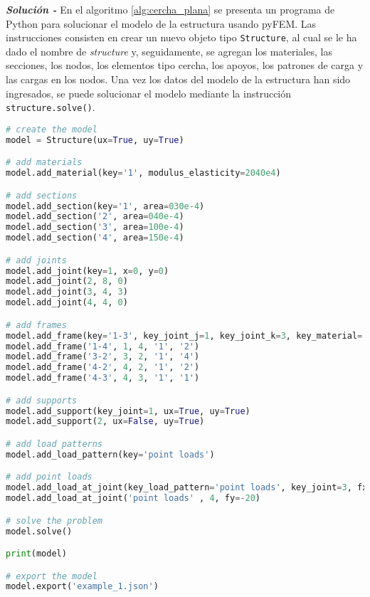 \begin{ejemplo}
    \textit{\textbf{Solución -}} En el algoritmo \ref{alg:cercha_plana} se presenta un programa de Python para solucionar el modelo de la estructura usando pyFEM. Las instrucciones consisten en crear un nuevo objeto tipo \verb|Structure|, al cual se le ha dado el nombre de \emph{structure} y, seguidamente, se agregan los materiales, las secciones, los nodos, los elementos tipo cercha, los apoyos, los patrones de carga y las cargas en los nodos. Una vez los datos del modelo de la estructura han sido ingresados, se puede solucionar el modelo mediante la instrucción \verb|structure.solve()|. \\

\begin{lstlisting}[language=Python,caption=Ingreso de los datos del modelo de la estructura a \textit{pyFEM}.,label=alg:cercha_plana, frame=single]
# create the model
model = Structure(ux=True, uy=True)

# add materials
model.add_material(key='1', modulus_elasticity=2040e4)

# add sections
model.add_section(key='1', area=030e-4)
model.add_section('2', area=040e-4)
model.add_section('3', area=100e-4)
model.add_section('4', area=150e-4)

# add joints
model.add_joint(key=1, x=0, y=0)
model.add_joint(2, 8, 0)
model.add_joint(3, 4, 3)
model.add_joint(4, 4, 0)

# add frames
model.add_frame(key='1-3', key_joint_j=1, key_joint_k=3, key_material='1', key_section='3')
model.add_frame('1-4', 1, 4, '1', '2')
model.add_frame('3-2', 3, 2, '1', '4')
model.add_frame('4-2', 4, 2, '1', '2')
model.add_frame('4-3', 4, 3, '1', '1')

# add supports
model.add_support(key_joint=1, ux=True, uy=True)
model.add_support(2, ux=False, uy=True)

# add load patterns
model.add_load_pattern(key='point loads')

# add point loads
model.add_load_at_joint(key_load_pattern='point loads', key_joint=3, fx=5 * 0.8, fy=5 * 0.6)
model.add_load_at_joint('point loads' , 4, fy=-20)

# solve the problem
model.solve()

print(model)

# export the model
model.export('example_1.json')
\end{lstlisting}
\end{ejemplo}











